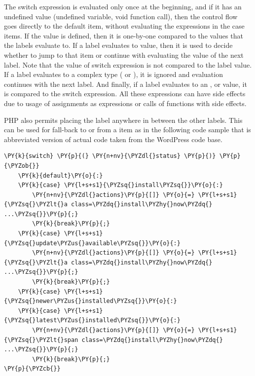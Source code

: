     The switch expression is evaluated only once 
    at the beginning, and if it has an undefined value (undefined variable, 
    void function call), then the control flow goes directly 
    to the default item, without evaluating the expressions 
    in the case items. If the value is defined, then it is 
    one-by-one compared to the values that the 
     labels evaluate to. If a  label evaluates 
    to  value, then it is used to decide whether to 
    jump to that  item or continue with evaluating 
    the value of the next  label. Note that the value of 
    switch expression is not compared to the  label value. 
    If a  label evaluates to a complex type ( or ), 
    it is ignored and evaluation continues with the next  label. 
    And finally, if a  label evaluates to an 
    ,  or  value, it is 
    compared to the switch expression. All these expressions can 
    have side effects due to usage of assignments as expressions 
    or calls of functions with side effects. 
    
    PHP also permits placing the  label anywhere in between 
    the other  labels. This can be used for fall-back 
    to or from a  item as in the following code sample 
    that is abbreviated version of actual code taken from the 
    WordPress\cite{wordpress} code base.
    
\begin{Verbatim}[commandchars=\\\{\}]
\PY{k}{switch} \PY{p}{(} \PY{n+nv}{\PYZdl{}status} \PY{p}{)} \PY{p}{\PYZob{}}
    \PY{k}{default}\PY{o}{:}
    \PY{k}{case} \PY{l+s+s1}{\PYZsq{}install\PYZsq{}}\PY{o}{:}
        \PY{n+nv}{\PYZdl{}actions}\PY{p}{[]} \PY{o}{=} \PY{l+s+s1}{\PYZsq{}\PYZlt{}a class=\PYZdq{}install\PYZhy{}now\PYZdq{} ...\PYZsq{}}\PY{p}{;}
        \PY{k}{break}\PY{p}{;}
    \PY{k}{case} \PY{l+s+s1}{\PYZsq{}update\PYZus{}available\PYZsq{}}\PY{o}{:}
        \PY{n+nv}{\PYZdl{}actions}\PY{p}{[]} \PY{o}{=} \PY{l+s+s1}{\PYZsq{}\PYZlt{}a class=\PYZdq{}install\PYZhy{}now\PYZdq{} ...\PYZsq{}}\PY{p}{;}
        \PY{k}{break}\PY{p}{;}
    \PY{k}{case} \PY{l+s+s1}{\PYZsq{}newer\PYZus{}installed\PYZsq{}}\PY{o}{:}
    \PY{k}{case} \PY{l+s+s1}{\PYZsq{}latest\PYZus{}installed\PYZsq{}}\PY{o}{:}
        \PY{n+nv}{\PYZdl{}actions}\PY{p}{[]} \PY{o}{=} \PY{l+s+s1}{\PYZsq{}\PYZlt{}span class=\PYZdq{}install\PYZhy{}now\PYZdq{} ...\PYZsq{}}\PY{p}{;}
        \PY{k}{break}\PY{p}{;}
\PY{p}{\PYZcb{}}
\end{Verbatim}
    
